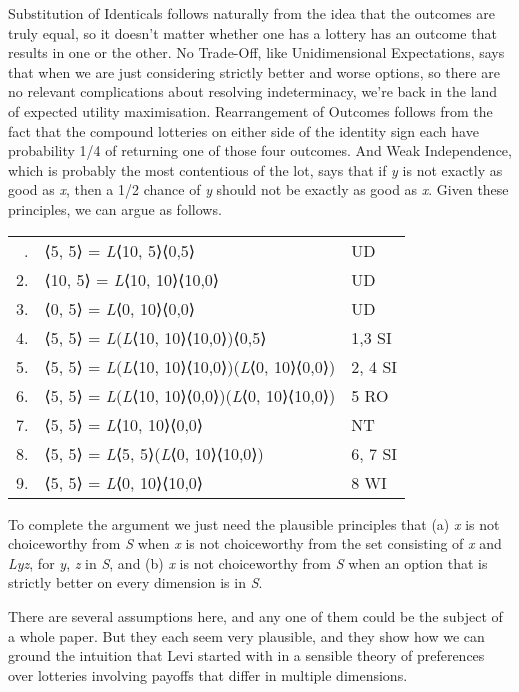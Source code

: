 \documentclass[
  11pt,
  letterpaper,
  DIV=11,
  numbers=noendperiod,
  twoside]{scrartcl}
\begin{document}
Substitution of Identicals follows naturally from the idea that the
outcomes are truly equal, so it doesn't matter whether one has a lottery
has an outcome that results in one or the other. No Trade-Off, like
Unidimensional Expectations, says that when we are just considering
strictly better and worse options, so there are no relevant
complications about resolving indeterminacy, we're back in the land of
expected utility maximisation. Rearrangement of Outcomes follows from
the fact that the compound lotteries on either side of the identity sign
each have probability 1/4 of returning one of those four outcomes. And
Weak Independence, which is probably the most contentious of the lot,
says that if \emph{y} is not exactly as good as \emph{x}, then a 1/2
chance of \emph{y} should not be exactly as good as \emph{x}. Given
these principles, we can argue as follows.

\begin{longtable}[]{@{}rll@{}}
\toprule\noalign{}
\endhead
\bottomrule\noalign{}
\endlastfoot
1. & ⟨5, 5⟩ = \emph{L}⟨10, 5⟩⟨0,5⟩ & UD \\
2. & ⟨10, 5⟩ = \emph{L}⟨10, 10⟩⟨10,0⟩ & UD \\
3. & ⟨0, 5⟩ = \emph{L}⟨0, 10⟩⟨0,0⟩ & UD \\
4. & ⟨5, 5⟩ = \emph{L}(\emph{L}⟨10, 10⟩⟨10,0⟩)⟨0,5⟩ & 1,3 SI \\
5. & ⟨5, 5⟩ = \emph{L}(\emph{L}⟨10, 10⟩⟨10,0⟩)(\emph{L}⟨0, 10⟩⟨0,0⟩) &
2, 4 SI \\
6. & ⟨5, 5⟩ = \emph{L}(\emph{L}⟨10, 10⟩⟨0,0⟩)(\emph{L}⟨0, 10⟩⟨10,0⟩) & 5
RO \\
7. & ⟨5, 5⟩ = \emph{L}⟨10, 10⟩⟨0,0⟩ & NT \\
8. & ⟨5, 5⟩ = \emph{L}⟨5, 5⟩(\emph{L}⟨0, 10⟩⟨10,0⟩) & 6, 7 SI \\
9. & ⟨5, 5⟩ = \emph{L}⟨0, 10⟩⟨10,0⟩ & 8 WI \\
\end{longtable}

To complete the argument we just need the plausible principles that (a)
\emph{x} is not choiceworthy from \emph{S} when \emph{x} is not
choiceworthy from the set consisting of \emph{x} and \emph{Lyz}, for
\emph{y}, \emph{z} in \emph{S}, and (b) \emph{x} is not choiceworthy
from \emph{S} when an option that is strictly better on every dimension
is in \emph{S}.

There are several assumptions here, and any one of them could be the
subject of a whole paper. But they each seem very plausible, and they
show how we can ground the intuition that Levi started with in a
sensible theory of preferences over lotteries involving payoffs that
differ in multiple dimensions.
\end{document}
